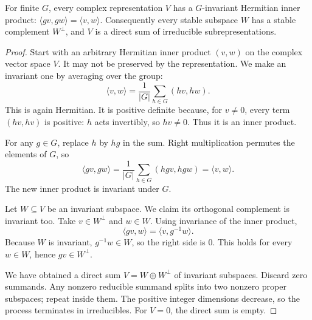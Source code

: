 \begin{theorem}[Maschke]\label{thm:maschke}
For finite $G$, every complex representation $V$ has a $G$-invariant Hermitian inner product: $\langle gv,gw\rangle=\langle v,w\rangle$. Consequently every stable subspace $W$ has a stable complement $W^\perp$, and $V$ is a direct sum of irreducible subrepresentations.
\end{theorem}
\begin{proof}
Start with an arbitrary Hermitian inner product $(v,w)$ on the complex vector space $V$. It may not be preserved by the representation. We make an invariant one by averaging over the group:
\[
\langle v,w\rangle=\frac1{|G|}\sum_{h\in G}(hv,hw).
\]
This is again Hermitian. It is positive definite because, for $v\ne0$, every term $(hv,hv)$ is positive: $h$ acts invertibly, so $hv\ne0$. Thus it is an inner product.

For any $g\in G$, replace $h$ by $hg$ in the sum. Right multiplication permutes the elements of $G$, so
\[
\langle gv,gw\rangle
=\frac1{|G|}\sum_{h\in G}(hgv,hgw)
=\langle v,w\rangle.
\]
The new inner product is invariant under $G$.

Let $W\subseteq V$ be an invariant subspace. We claim its orthogonal complement is invariant too. Take $v\in W^\perp$ and $w\in W$. Using invariance of the inner product,
\[
\langle gv,w\rangle=\langle v,g^{-1}w\rangle.
\]
Because $W$ is invariant, $g^{-1}w\in W$, so the right side is $0$. This holds for every $w\in W$, hence $gv\in W^\perp$.

We have obtained a direct sum $V=W\oplus W^\perp$ of invariant subspaces. Discard zero summands. Any nonzero reducible summand splits into two nonzero proper subspaces; repeat inside them. The positive integer dimensions decrease, so the process terminates in irreducibles. For $V=0$, the direct sum is empty.
\end{proof}

